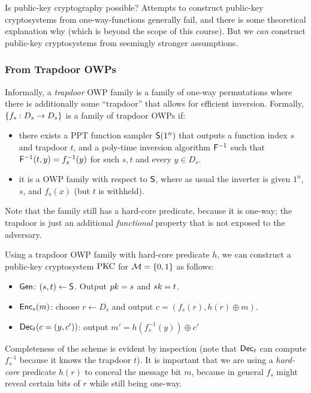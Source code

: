 \documentclass[11pt]{article}
\begin{document}
Is public-key cryptography possible?  Attempts to construct public-key
cryptosystems from one-way-functions generally fail, and there is some
theoretical explanation why (which is beyond the scope of this
course).  But we \emph{can} construct public-key cryptosystems from
seemingly stronger assumptions.

\subsubsection{From Trapdoor OWPs}
\label{sec:from-trapdoor-owps}

Informally, a \emph{trapdoor} OWP family is a family of one-way
permutations where there is additionally some ``trapdoor'' that allows
for efficient inversion.  Formally, $\{f_{s}: D_{s} \to D_{s}\}$ is a
family of trapdoor OWPs if:
\begin{itemize}
\item there exists a PPT function sampler $\mathsf{S}(1^{n})$ that
  outputs a function index $s$ and trapdoor $t$, and a poly-time
  inversion algorithm $\mathsf{F}^{-1}$ such that $\mathsf{F}^{-1}(t, y) =
  f_{s}^{-1}(y)$ for such $s,t$ and every $y \in D_{s}$.
\item it is a OWP family with respect to $\mathsf{S}$, where as usual
  the inverter is given $1^{n}$, $s$, and $f_{s}(x)$ (but $t$ is
  withheld).
\end{itemize}
Note that the family still has a hard-core predicate, because it is
one-way; the trapdoor is just an additional \emph{functional} property
that is not exposed to the adversary.

Using a trapdoor OWP family with hard-core predicate $h$, we can
construct a public-key cryptosystem $\text{PKC}$ for $\mathcal{M} = \{0,1\}$ as
follows:
\begin{itemize}
\item $\mathsf{Gen}$: $(s, t) \gets \mathsf{S}$.  Output $pk = s$ and $sk =
  t$.
\item $\mathsf{Enc}_{s}(m)$: choose $r \gets D_{s}$ and output $c =
  (f_{s}(r), h(r) \oplus m)$.
\item $\mathsf{Dec}_{t}(c = (y, c'))$: output $m' = h(f_{s}^{-1}(y)) \oplus
  c'$ 
\end{itemize}
Completeness of the scheme is evident by inspection (note that
$\mathsf{Dec}_{t}$ can compute $f_{s}^{-1}$ because it knows the trapdoor
$t$).  It is important that we are using a \emph{hard-core} predicate
$h(r)$ to conceal the message bit $m$, because in general $f_{s}$
might reveal certain bits of $r$ while still being one-way.
\end{document}
